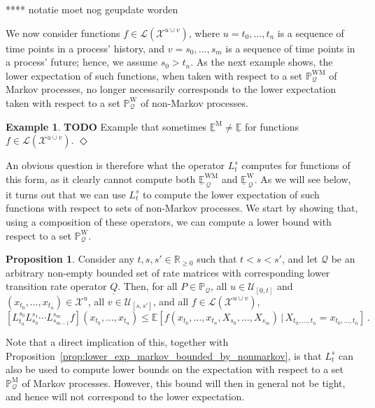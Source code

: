 \documentclass[10pt]{paper}
\theoremstyle{definition}
\newtheorem{exmp}{Example}%
\newtheorem{proposition}[theorem]{Proposition}
\newcommand{\reals}{\mathbb{R}}
\newcommand{\realsnonneg}{\reals_{\geq 0}}
\newcommand{\states}{\mathcal{X}}
\newcommand{\processes}{\mathbb{P}}
\newcommand{\mprocesses}{\processes^{\mathrm{M}}}
\newcommand{\wprocesses}{\processes^{\mathrm{W}}}
\newcommand{\wmprocesses}{\processes^{\mathrm{WM}}}
\newcommand{\gambles}{\mathcal{L}}
\newcommand{\rateset}{\mathcal{Q}}
\newcommand{\lrate}{\underline{Q}}
\newcommand{\exampleend}{\hfill$\Diamond$}
\begin{document}
**** notatie moet nog geupdate worden

We now consider functions $f\in\gambles(\states^{u\cup v})$, where $u=t_0,\ldots,t_n$ is a sequence of time points in a process' history, and $v=s_0,\ldots,s_m$ is a sequence of time points in a process' future; hence, we assume $s_0>t_n$. As the next example shows, the lower expectation of such functions, when taken with respect to a set $\wmprocesses_\rateset$ of Markov processes, no longer necessarily corresponds to the lower expectation taken with respect to a set $\wprocesses_\rateset$ of non-Markov processes.

\begin{exmp}
{\bf TODO} Example that sometimes $\underline{\mathbb{E}}^\mathrm{M}\neq \underline{\mathbb{E}}$ for functions $f\in\gambles(\states^{u\cup v})$.
\exampleend
\end{exmp}

An obvious question is therefore what the operator $L_t^s$ computes for functions of this form, as it clearly cannot compute both $\underline{\mathbb{E}}^{\mathrm{WM}}_{\,\rateset}$ and $\underline{\mathbb{E}}^\mathrm{W}_{\,\rateset}$. As we will see below, it turns out that we can use $L_t^s$ to compute the lower expectation of such functions with respect to sets of non-Markov processes. We start by showing that, using a composition of these operators, we can compute a lower bound with respect to a set $\wprocesses_\rateset$.
\begin{proposition}\label{prop:multivar_bounded}
Consider any $t,s,s'\in\realsnonneg$ such that $t<s<s'$, and let $\rateset$ be an arbitrary non-empty bounded set of rate matrices with corresponding lower transition rate operator $\lrate$. Then, for all $P\in\processes_\rateset$, all $u\in\mathcal{U}_{[0,t]}$ and $(x_{t_0},\ldots,x_{t_n})\in\states^u$, all $v\in\mathcal{U}_{[s,s']}$, and all $f\in\gambles(\states^{u\cup v})$,
\begin{equation*}
\left[L_{t_n}^{s_0}L_{s_0}^{s_1}\cdots L_{s_{m-1}}^{s_m}f\right](x_{t_0},\ldots,x_{t_n}) \leq \mathbb{E}[f(x_{t_0},\ldots,x_{t_n},X_{s_0},\ldots,X_{s_m})\,\vert\,X_{t_0,\ldots,t_n}=x_{t_0,\ldots,t_n}]\,.
\end{equation*}
\end{proposition}

Note that a direct implication of this, together with Proposition~\ref{prop:lower_exp_markov_bounded_by_nonmarkov}, is that $L_t^s$ can also be used to compute lower bounds on the expectation with respect to a set $\mprocesses_\rateset$ of Markov processes. However, this bound will then in general not be tight, and hence will not correspond to the lower expectation.
\end{document}
